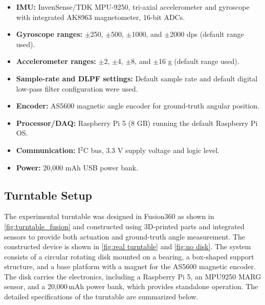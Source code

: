 \documentclass{iutbscthesis}
\begin{document}
\begin{itemize}
  \item \textbf{IMU:} InvenSense/TDK MPU-9250, tri-axial accelerometer and gyroscope with integrated AK8963 magnetometer, 16-bit ADCs.
  \item \textbf{Gyroscope ranges:} $\pm$250, $\pm$500, $\pm$1000, and $\pm$2000 dps (default range used).
  \item \textbf{Accelerometer ranges:} $\pm$2, $\pm$4, $\pm$8, and $\pm$16 g (default range used).
  \item \textbf{Sample-rate and DLPF settings:} Default sample rate and default digital low-pass filter configuration were used.
  \item \textbf{Encoder:} AS5600 magnetic angle encoder for ground-truth angular position.
  \item \textbf{Processor/DAQ:} Raspberry Pi 5 (8 GB) running the default Raspberry Pi OS.
  \item \textbf{Communication:} I$^2$C bus, 3.3 V supply voltage and logic level.
  \item \textbf{Power:} 20,000 mAh USB power bank.
\end{itemize}



\subsection{Turntable Setup}\label{subsec:turntable_setup}

The experimental turntable was designed in Fusion360 as shown in \autoref{fig:turntable_fusion} and constructed using 3D-printed parts and integrated sensors 
to provide both actuation and ground-truth angle measurement. The constructed device is shown in \autoref{fig:real turntable} and \autoref{fig:no disk}. 
The system consists of a circular rotating disk mounted on a bearing, 
a box-shaped support structure, and a base platform with a magnet for the AS5600 magnetic encoder. 
The disk carries the electronics, including a Raspberry Pi 5, an MPU9250 MARG sensor, and a 20,000\,mAh power bank, 
which provides standalone operation. The detailed specifications of the turntable are summarized below.
\end{document}
